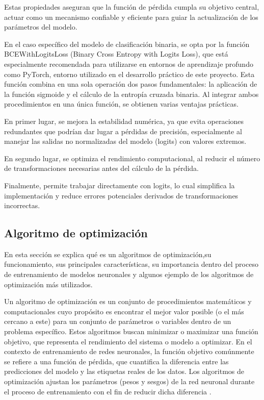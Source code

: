 Estas propiedades aseguran que la función de pérdida cumpla su objetivo central, actuar como un mecanismo confiable y eficiente para guiar la actualización de los parámetros del modelo. \cite{ultralytics_loss_function}

En el caso específico del modelo de clasificación binaria, se opta por la función BCEWithLogitsLoss (Binary Cross Entropy with Logits Loss), que está especialmente recomendada para utilizarse en entornos de aprendizaje profundo como PyTorch, entorno utilizado en el desarrollo práctico de este proyecto. Esta función combina en una sola operación dos pasos fundamentales: la aplicación de la función sigmoide y el cálculo de la entropía cruzada binaria. Al integrar ambos procedimientos en una única función, se obtienen varias ventajas prácticas.\cite{datacamp_loss_function}

En primer lugar, se mejora la estabilidad numérica, ya que evita operaciones redundantes que podrían dar lugar a pérdidas de precisión, especialmente al manejar las salidas no normalizadas del modelo (logits) con valores extremos.

En segundo lugar, se optimiza el rendimiento computacional, al reducir el número de transformaciones necesarias antes del cálculo de la pérdida. 

Finalmente, permite trabajar directamente con logits, lo cual simplifica la implementación y reduce errores potenciales derivados de transformaciones incorrectas. \cite{bigdatafran_pytorch_classification}




\subsection{Algoritmo de optimización}\label{sec:alg-opt}
En esta sección se explica qué es un algoritmos de optimización,su funcionamiento, sus principales características, su importancia dentro del proceso de entrenamiento de modelos neuronales y algunos ejemplo de los algoritmos de optimización más utilizados.

Un algoritmo de optimización es un conjunto de procedimientos matemáticos y computacionales cuyo propósito es encontrar el mejor valor posible (o el más cercano a este) para un conjunto de parámetros o variables dentro de un problema específico. Estos algoritmos buscan minimizar o maximizar una función objetivo, que representa el rendimiento del sistema o modelo a optimizar. En el contexto de entrenamiento de redes neuronales, la función objetivo comúnmente se refiere a una función de pérdida, que cuantifica la diferencia entre las predicciones del modelo y las etiquetas reales de los datos. Los algoritmos de optimización ajustan los parámetros (pesos y sesgos) de la red neuronal durante el proceso de entrenamiento con el fin de reducir dicha diferencia \cite{goodfellow2016deep}.


